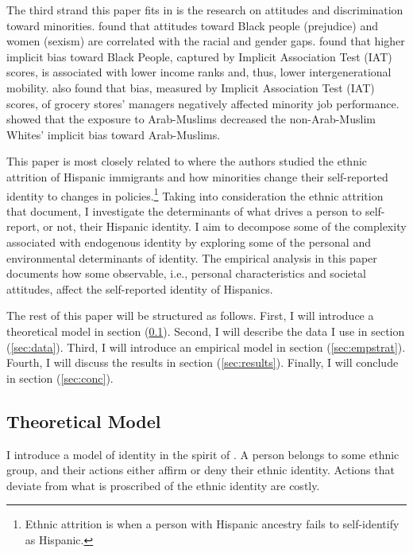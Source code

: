 \documentclass[12pt, fullpage]{article}
\begin{document}
The third strand this paper fits in is the research on attitudes and discrimination toward minorities. \citet{charlesPrejudiceWagesEmpirical2008,charlesEffectsSexismAmerican2018} found that attitudes toward Black people (prejudice) and women (sexism) are correlated with the racial and gender gaps. \citet{chettyRaceEconomicOpportunity2020} found that higher implicit bias toward Black People, captured by Implicit Association Test (IAT) scores, is associated with lower income ranks and, thus, lower intergenerational mobility. \citet{gloverDiscriminationSelfFulfillingProphecy2017} also found that bias, measured by Implicit Association Test (IAT) scores, of grocery stores' managers negatively affected minority job performance. \citet{bursztynImmigrantNextDoor2022} showed that the exposure to Arab-Muslims decreased the non-Arab-Muslim Whites' implicit bias toward Arab-Muslims. 

This paper is most closely related to \citet{antmanEthnicAttritionObserved2016,antmanIncentivesIdentifyRacial2015,antmanAmericanIndianCasinos2021} where the authors studied the ethnic attrition of Hispanic immigrants and how minorities change their self-reported identity to changes in policies.\footnote{Ethnic attrition is when a person with Hispanic ancestry fails to self-identify as Hispanic.} Taking into consideration the ethnic attrition that \citet{antmanEthnicAttritionObserved2016} document, I investigate the determinants of what drives a person to self-report, or not, their Hispanic identity. I aim to decompose some of the complexity associated with endogenous identity by exploring some of the personal and environmental determinants of identity. The empirical analysis in this paper documents how some observable, i.e., personal characteristics and societal attitudes, affect the self-reported identity of Hispanics. 

The rest of this paper will be structured as follows. First, I will introduce a theoretical model in section (\ref{sec:model}). Second, I will describe the data I use in section (\ref{sec:data}). Third, I will introduce an empirical model in section (\ref{sec:empstrat}). Fourth, I will discuss the results in section (\ref{sec:results}). Finally, I will conclude in section (\ref{sec:conc}). 

\subsection{Theoretical Model}\label{sec:model}

I introduce a model of identity in the spirit of \citet{akerlofEconomicsIdentity2000}. A person belongs to some ethnic group, and their actions either affirm or deny their ethnic identity. Actions that deviate from what is proscribed of the ethnic identity are costly. 
\end{document}
